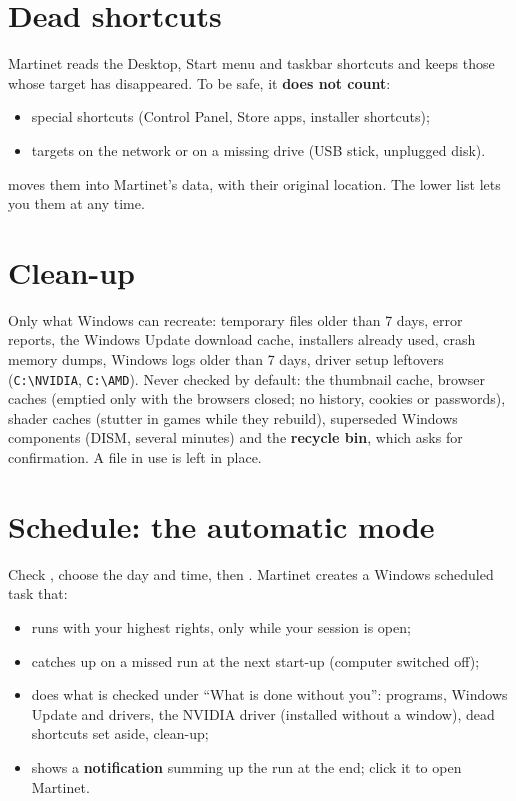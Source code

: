 \section{Dead shortcuts}\label{sec:raccourcis}


Martinet reads the Desktop, Start menu and taskbar shortcuts and keeps those whose target has
disappeared. To be safe, it \textbf{does not count}:
\begin{itemize}
\item special shortcuts (Control Panel, Store apps, installer shortcuts);
\item targets on the network or on a missing drive (USB stick, unplugged disk).
\end{itemize}
 moves them into Martinet's data, with their original location. The lower
list lets you  them at any time.

\section{Clean-up}\label{sec:menage}


Only what Windows can recreate: temporary files older than 7 days, error reports, the Windows Update
download cache, installers already used, crash memory dumps, Windows logs older than 7 days, driver setup
leftovers (\texttt{C:\textbackslash NVIDIA}, \texttt{C:\textbackslash AMD}). Never checked by default: the
thumbnail cache, browser caches (emptied only with the browsers closed; no history, cookies or passwords),
shader caches (stutter in games while they rebuild), superseded Windows components (DISM, several
minutes) and the \textbf{recycle bin}, which asks for confirmation. A file in use is left in place.

\section{Schedule: the automatic mode}\label{sec:planif}


Check , choose the day and time, then . Martinet creates a Windows
scheduled task that:
\begin{itemize}
\item runs with your highest rights, only while your session is open;
\item catches up on a missed run at the next start-up (computer switched off);
\item does what is checked under “What is done without you”: programs, Windows Update and drivers,
the NVIDIA driver (installed without a window), dead shortcuts set aside, clean-up;
\item shows a \textbf{notification} summing up the run at the end; click it to open Martinet.
\end{itemize}

